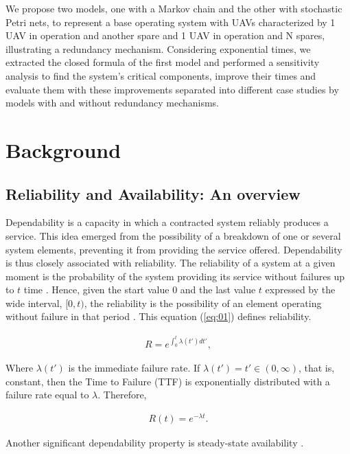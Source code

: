 \documentclass[conference]{IEEEtran}
\begin{document}
We propose two models, one with a Markov chain and the other with stochastic Petri nets, to represent a base operating system with UAVs characterized by 1 UAV in operation and another spare and 1 UAV in operation and N spares, illustrating a redundancy mechanism. Considering exponential times, we extracted the closed formula of the first model and performed a sensitivity analysis to find the system’s critical components, improve their times and evaluate them with these improvements separated into different case studies by models with and without redundancy mechanisms.



\section{Background}\label{sec:background}

\subsection{Reliability and Availability: An overview}
Dependability is a capacity in which a contracted system reliably produces a service. This idea emerged from the possibility of a breakdown of one or several system elements, preventing it from providing the service offered. Dependability is thus closely associated with reliability. The reliability of a system at a given moment is the probability of the system providing its service without failures up to $t$ time \citep{avizienis2004basic}. Hence, given the start value $0$ and the last value $t$ expressed by the wide interval, $[0,t)$, the reliability is the possibility of an element operating without failure in that period \citep{trivedi2008probability}. This equation (\ref{eq:01}) defines reliability.

\begin{align}\label{eq:01}
R = e^{\int_{0}^{t} \lambda(t')dt'},
\end{align}

Where $\lambda (t')$ is the immediate failure rate. If $\lambda (t') = t'\in (0,\infty)$, that is, constant, then the Time to Failure (TTF) is exponentially distributed with a failure rate equal to $\lambda$. Therefore,

\begin{align}
R(t) = e^{- \lambda t}.
\end{align}
 
Another significant dependability property is steady-state availability \citep{trivedi2008probability}.
\end{document}
